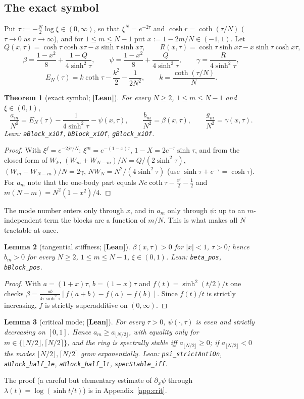 \documentclass[11pt]{article}
\newtheorem{theorem}{Theorem}[section]
\newtheorem{lemma}[theorem]{Lemma}
\theoremstyle{definition}
\theoremstyle{remark}
\newcommand{\st}[1]{\textbf{[#1]}}
\newcommand{\lean}[1]{\nolinkurl{#1}}
\begin{document}
\subsection{The exact symbol}
Put $\tau:=-\frac N2\log\xi\in(0,\infty)$, so that $\xi^N=e^{-2\tau}$ and $\cosh r=\coth(\tau/N)$ ($\tau\to0$ as $r\to\infty$), and
for $1\le m\le N-1$ put $x:=1-2m/N\in(-1,1)$. Let
\[
Q(x,\tau)=\cosh\tau\cosh x\tau-x\sinh\tau\sinh x\tau,\qquad R(x,\tau)=\cosh\tau\sinh x\tau-x\sinh\tau\cosh x\tau,
\]
\[
\beta=\frac{1-x^2}8+\frac{1-Q}{4\sinh^2\tau},\qquad \psi=\frac{1-x^2}8+\frac{Q}{4\sinh^2\tau},\qquad \gamma=\frac{R}{4\sinh^2\tau},
\]
\[
E_N(\tau)=k\coth\tau-\frac{k^2}2-\frac1{2N^2},\qquad k=\frac{\coth(\tau/N)}N .
\]
\begin{theorem}[exact symbol; \st{Lean}]\label{thm:symbol}
For every $N\ge2$, $1\le m\le N-1$ and $\xi\in(0,1)$,
\[
\frac{a_m}{N^2}=E_N(\tau)-\frac1{4\sinh^2\tau}-\psi(x,\tau),\qquad \frac{b_m}{N^2}=\beta(x,\tau),\qquad \frac{g_m}{N^2}=\gamma(x,\tau).
\]
Lean: \lean{aBlock_xiOf}, \lean{bBlock_xiOf}, \lean{gBlock_xiOf}.
\end{theorem}
\begin{proof}
With $\xi^j=e^{-2j\tau/N}$: $\xi^m=e^{-(1-x)\tau}$, $1-X=2e^{-\tau}\sinh\tau$, and from the closed form of $W_k$,
$(W_m+W_{N-m})/N=Q/(2\sinh^2\tau)$, $(W_m-W_{N-m})/N=2\gamma$, $NW_N=N^2/(4\sinh^2\tau)$ (use $\sinh\tau+e^{-\tau}=\cosh\tau$). For
$a_m$ note that the one-body part equals $Nc\coth\tau-\frac{c^2}2-\frac12$ and $m(N-m)=N^2(1-x^2)/4$.
\end{proof}
The mode number enters only through $x$, and in $a_m$ only through $\psi$: up to an $m$-independent term the blocks are a
function of $m/N$. This is what makes all $N$ tractable at once.

\begin{lemma}[tangential stiffness; \st{Lean}]\label{lem:bpos}
$\beta(x,\tau)>0$ for $|x|<1$, $\tau>0$; hence $b_m>0$ for every $N\ge2$, $1\le m\le N-1$, $\xi\in(0,1)$.
Lean: \lean{beta_pos}, \lean{bBlock_pos}.
\end{lemma}
\begin{proof}
With $a=(1+x)\tau$, $b=(1-x)\tau$ and $f(t)=\sinh^2(t/2)/t$ one checks $\beta=\frac{ab}{4\tau\sinh^2\tau}[f(a+b)-f(a)-f(b)]$. Since
$f(t)/t$ is strictly increasing, $f$ is strictly superadditive on $(0,\infty)$.
\end{proof}

\begin{lemma}[critical mode; \st{Lean}]\label{lem:crit}
For every $\tau>0$, $\psi(\cdot,\tau)$ is even and strictly decreasing on $[0,1]$. Hence $a_m\ge a_{\lfloor N/2\rfloor}$, with
equality only for $m\in\{\lfloor N/2\rfloor,\lceil N/2\rceil\}$, and the ring is spectrally stable iff
$a_{\lfloor N/2\rfloor}\ge0$; if $a_{\lfloor N/2\rfloor}<0$ the modes $\lfloor N/2\rfloor,\lceil N/2\rceil$ grow exponentially.
Lean: \lean{psi_strictAntiOn}, \lean{aBlock_half_le}, \lean{aBlock_half_lt}, \lean{specStable_iff}.
\end{lemma}
The proof (a careful but elementary estimate of $\partial_x\psi$ through $\lambda(t)=\log(\sinh t/t)$) is in
Appendix~\ref{app:crit}.
\end{document}
